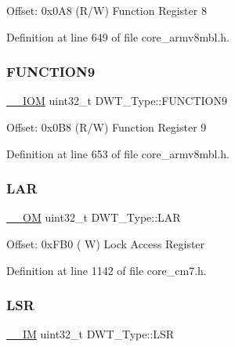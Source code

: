 Offset\+: 0x0\+A8 (R/W) Function Register 8 

Definition at line 649 of file core\+\_\+armv8mbl.\+h.

\mbox{\label{struct_d_w_t___type_a379b5b8f7d40003b7bdabd535e0378a1}} 
\subsubsection{\texorpdfstring{F\+U\+N\+C\+T\+I\+O\+N9}{FUNCTION9}}
{\footnotesize\ttfamily \hyperlink{core__sc300_8h_ab6caba5853a60a17e8e04499b52bf691}{\+\_\+\+\_\+\+I\+OM} uint32\+\_\+t D\+W\+T\+\_\+\+Type\+::\+F\+U\+N\+C\+T\+I\+O\+N9}

Offset\+: 0x0\+B8 (R/W) Function Register 9 

Definition at line 653 of file core\+\_\+armv8mbl.\+h.

\mbox{\label{struct_d_w_t___type_a4b8037802a3b25e367f0977d86f754ad}} 
\subsubsection{\texorpdfstring{L\+AR}{LAR}}
{\footnotesize\ttfamily \hyperlink{core__sc300_8h_a0ea2009ed8fd9ef35b48708280fdb758}{\+\_\+\+\_\+\+OM} uint32\+\_\+t D\+W\+T\+\_\+\+Type\+::\+L\+AR}

Offset\+: 0x\+F\+B0 ( W) Lock Access Register 

Definition at line 1142 of file core\+\_\+cm7.\+h.

\mbox{\label{struct_d_w_t___type_a4281befcc19ee69afdd50801cb1c9bcf}} 
\subsubsection{\texorpdfstring{L\+SR}{LSR}}
{\footnotesize\ttfamily \hyperlink{core__sc300_8h_a4cc1649793116d7c2d8afce7a4ffce43}{\+\_\+\+\_\+\+IM} uint32\+\_\+t D\+W\+T\+\_\+\+Type\+::\+L\+SR}

